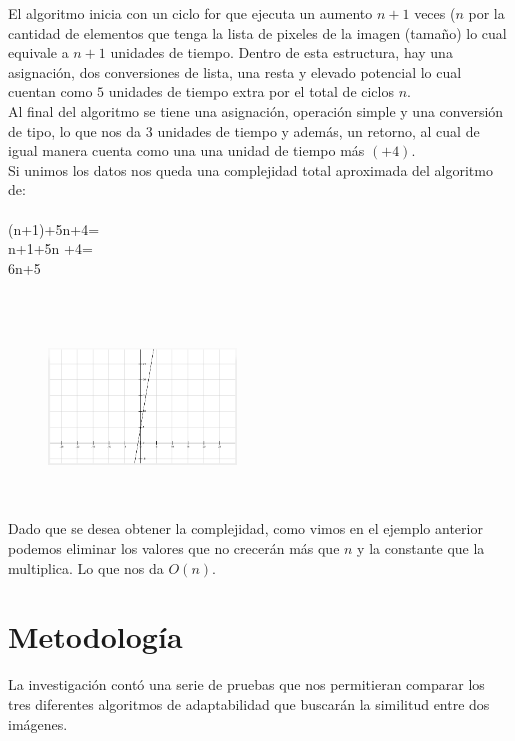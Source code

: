 \documentclass[letterpaper, 10 pt, conference]{ieeeconf}  %
\begin{document}
\indent El algoritmo inicia con un ciclo for que ejecuta un aumento $n + 1$ veces ($n$ por la cantidad de elementos que tenga la lista de pixeles de la imagen (tama\~no) lo cual equivale a $n+1$ unidades de tiempo. Dentro de esta estructura, hay una asignaci\'on, dos conversiones de lista, una resta y elevado potencial lo cual cuentan como $5$ unidades de tiempo extra por el total de ciclos $n$.\\
\indent Al final del algoritmo se tiene una asignaci\'on, operaci\'on simple y una conversi\'on de tipo, lo que nos da $3$ unidades de tiempo y adem\'as, un retorno, al cual de igual manera cuenta como una una unidad de tiempo m\'as $(+4)$.\\
\indent Si unimos los datos nos queda una complejidad total aproximada del algoritmo de: \\\\
\indent\indent (n+1)+5n+4=\\
\indent\indent n+1+5n +4=\\
\indent\indent 6n+5\\\\
\begin{figure}[h]
\centering
\includegraphics[width=5cm, height=5cm]{GraficaMSE}
\end{figure}
\indent Dado que se desea obtener la complejidad, como vimos en el ejemplo anterior podemos eliminar los valores que no crecer\'an m\'as que $n$ y la constante que la multiplica. Lo que nos da $O(n)$.

\section{\textbf{Metodología}}

\setlength{\parindent}{1cm}La investigaci\'on cont\'o una serie de pruebas que nos permitieran comparar los tres diferentes algoritmos de adaptabilidad que buscar\'an la similitud entre dos im\'agenes.
\end{document}
